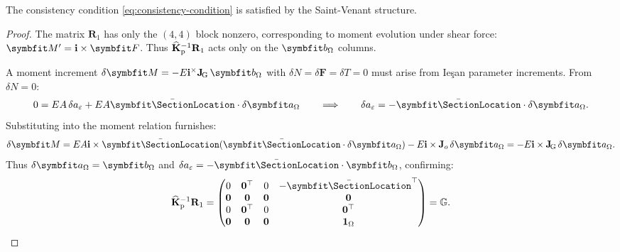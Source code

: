 \begin{Details}
\begin{proposition}
The consistency condition \eqref{eq:consistency-condition} is satisfied by 
the Saint-Venant structure.
\end{proposition}

\begin{proof}
The matrix $\mathbf{R}_1$ has only the $(4,4)$ block nonzero, corresponding 
to moment evolution under shear force: $\bm{M}' = \FrameBasis \times \bm{F}$.
Thus $\widehat{\mathbf{K}}_{\rm p}^{-1}\mathbf{R}_1$ acts only on the $\bm{b}_{\Section}$ columns.

A moment increment $\delta\bm{M} = -E\FrameBasis^\times\IntRGoRG\,\bm{b}_{\Section}$ 
with $\delta N = \delta\bm{F} = \delta T = 0$ must arise from Ieşan parameter 
increments. 
From $\delta N = 0$:
\begin{equation*}
0 = EA\,\delta a_\varepsilon + EA\CentroidLocation \cdot \delta\bm{a}_\Omega
\qquad \Longrightarrow \qquad
\delta a_\varepsilon = -\CentroidLocation \cdot \delta\bm{a}_\Omega.
\end{equation*}
Substituting into the moment relation furnishes:
\begin{equation*}
\delta\bm{M} = EA\FrameBasis\times\CentroidLocation(\CentroidLocation \cdot \delta\bm{a}_\Omega) 
- E\FrameBasis\times\IntRoR\,\delta\bm{a}_\Omega
= -E\FrameBasis\times\IntRGoRG\,\delta\bm{a}_\Omega.
\end{equation*}
Thus $\delta\bm{a}_\Omega = \bm{b}_{\Section}$ and 
$\delta a_\varepsilon = -\CentroidLocation \cdot \bm{b}_{\Section}$, confirming:
\begin{equation*}
\IesanStiff^{-1}\mathbf{R}_1 = \begin{pmatrix}
0 & \mathbf{0}^\top & 0 & -\CentroidLocation^\top \\
\mathbf{0} & \mathbf{0} & \mathbf{0} & \mathbf{0} \\
0 & \mathbf{0}^\top & 0 & \mathbf{0}^\top \\
\mathbf{0} & \mathbf{0} & \mathbf{0} & \mathbf{1}_\Section
\end{pmatrix} = \IesanEvolveSP. \qedhere
\end{equation*}
\end{proof}
\end{Details}
